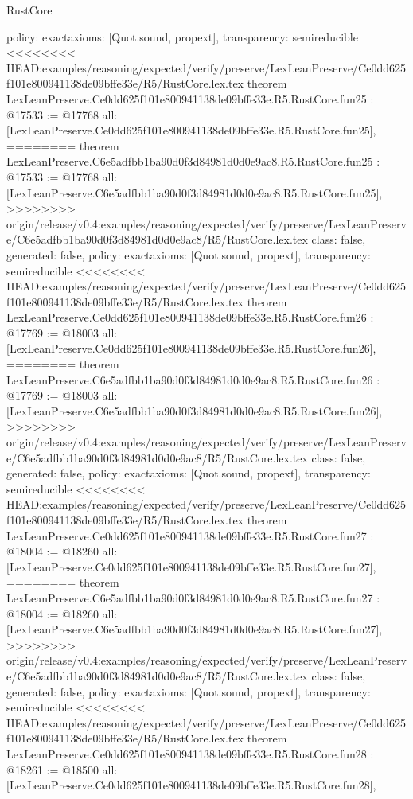 \begin{lexlean}{RustCore}
\begin{coremodule}
{\begin{coremodule}
{{{{{{{{{{{{{{{{{{{{{{{{{{{{  policy: exact{axioms: [Quot.sound, propext]},
  transparency: semireducible
}
<<<<<<<< HEAD:examples/reasoning/expected/verify/preserve/LexLeanPreserve/Ce0dd625f101e800941138de09bffe33e/R5/RustCore.lex.tex
theorem LexLeanPreserve.Ce0dd625f101e800941138de09bffe33e.R5.RustCore.fun25 : @17533 := @17768 {
  all: [LexLeanPreserve.Ce0dd625f101e800941138de09bffe33e.R5.RustCore.fun25],
========
theorem LexLeanPreserve.C6e5adfbb1ba90d0f3d84981d0d0e9ac8.R5.RustCore.fun25 : @17533 := @17768 {
  all: [LexLeanPreserve.C6e5adfbb1ba90d0f3d84981d0d0e9ac8.R5.RustCore.fun25],
>>>>>>>> origin/release/v0.4:examples/reasoning/expected/verify/preserve/LexLeanPreserve/C6e5adfbb1ba90d0f3d84981d0d0e9ac8/R5/RustCore.lex.tex
  class: false,
  generated: false,
  policy: exact{axioms: [Quot.sound, propext]},
  transparency: semireducible
}
<<<<<<<< HEAD:examples/reasoning/expected/verify/preserve/LexLeanPreserve/Ce0dd625f101e800941138de09bffe33e/R5/RustCore.lex.tex
theorem LexLeanPreserve.Ce0dd625f101e800941138de09bffe33e.R5.RustCore.fun26 : @17769 := @18003 {
  all: [LexLeanPreserve.Ce0dd625f101e800941138de09bffe33e.R5.RustCore.fun26],
========
theorem LexLeanPreserve.C6e5adfbb1ba90d0f3d84981d0d0e9ac8.R5.RustCore.fun26 : @17769 := @18003 {
  all: [LexLeanPreserve.C6e5adfbb1ba90d0f3d84981d0d0e9ac8.R5.RustCore.fun26],
>>>>>>>> origin/release/v0.4:examples/reasoning/expected/verify/preserve/LexLeanPreserve/C6e5adfbb1ba90d0f3d84981d0d0e9ac8/R5/RustCore.lex.tex
  class: false,
  generated: false,
  policy: exact{axioms: [Quot.sound, propext]},
  transparency: semireducible
}
<<<<<<<< HEAD:examples/reasoning/expected/verify/preserve/LexLeanPreserve/Ce0dd625f101e800941138de09bffe33e/R5/RustCore.lex.tex
theorem LexLeanPreserve.Ce0dd625f101e800941138de09bffe33e.R5.RustCore.fun27 : @18004 := @18260 {
  all: [LexLeanPreserve.Ce0dd625f101e800941138de09bffe33e.R5.RustCore.fun27],
========
theorem LexLeanPreserve.C6e5adfbb1ba90d0f3d84981d0d0e9ac8.R5.RustCore.fun27 : @18004 := @18260 {
  all: [LexLeanPreserve.C6e5adfbb1ba90d0f3d84981d0d0e9ac8.R5.RustCore.fun27],
>>>>>>>> origin/release/v0.4:examples/reasoning/expected/verify/preserve/LexLeanPreserve/C6e5adfbb1ba90d0f3d84981d0d0e9ac8/R5/RustCore.lex.tex
  class: false,
  generated: false,
  policy: exact{axioms: [Quot.sound, propext]},
  transparency: semireducible
}
<<<<<<<< HEAD:examples/reasoning/expected/verify/preserve/LexLeanPreserve/Ce0dd625f101e800941138de09bffe33e/R5/RustCore.lex.tex
theorem LexLeanPreserve.Ce0dd625f101e800941138de09bffe33e.R5.RustCore.fun28 : @18261 := @18500 {
  all: [LexLeanPreserve.Ce0dd625f101e800941138de09bffe33e.R5.RustCore.fun28],
}}}}}}}}}}}}}}}}}}}}}}}}}}}}}}}
\end{coremodule}}
\end{coremodule}
\end{lexlean}
